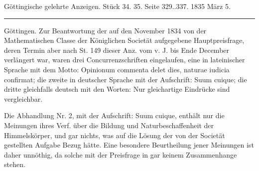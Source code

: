 \clearpage
{}
\begin{center}\small Göttingische gelehrte Anzeigen. Stück 34. 35. Seite 329..337. 1835 März 5.\\[3pt]\rule{.72\linewidth}{.3pt}\end{center}

Göttingen. Zur Beantwortung der auf den November 1834 von der Mathematischen Classe der Königlichen Societät aufgegebene Hauptpreisfrage, deren Termin aber nach St. 149 dieser Anz. vom v. J. bis Ende December verlängert war, waren drei Concurrenzschriften eingelaufen, eine in lateinischer Sprache mit dem Motto: Opinionum commenta delet dies, naturae iudicia confirmat; die zweite in deutscher Sprache mit der Aufschrift: Suum cuique; die dritte gleichfalls deutsch mit den Worten: Nur gleichartige Eindrücke sind vergleichbar.

Die Abhandlung Nr. 2, mit der Aufschrift: Suum cuique, enthält nur die Meinungen ihres Verf. über die Bildung und Naturbeschaffenheit der Himmelskörper, und gar nichts, was auf die Lösung der von der Societät gestellten Aufgabe Bezug hätte. Eine besondere Beurtheilung jener Meinungen ist daher unnöthig, da solche mit der Preisfrage in gar keinem Zusammenhange stehen.

